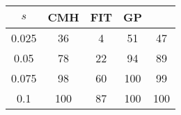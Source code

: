 \centering \begin{tabular}{c|c|c|c|c}
$s$	&CMH	&FIT	&GP	&\sc{Clear}\\\hline
0.025	&36	&4	&51	&47\\
0.05	&78	&22	&94	&89\\
0.075	&98	&60	&100	&99\\
0.1	&100	&87	&100	&100\\
\end{tabular}
